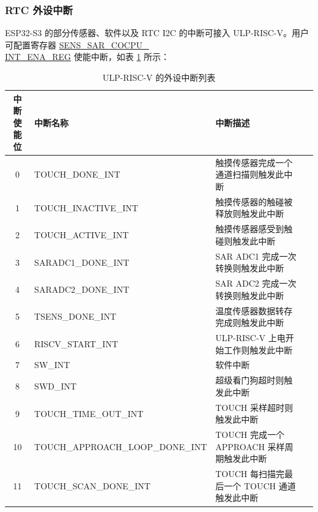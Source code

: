 \documentclass[main\_\_CN.tex]{subfiles}
\begin{document}
\subsubsection{RTC 外设中断}
ESP32-S3 的部分传感器、软件以及 RTC I2C 的中断可接入 ULP-RISC-V。用户可配置寄存器 \hyperref[regdesc:SENSSARCOCPUINTENAREG]{SENS\_SAR\_COCPU\_\\INT\_ENA\_REG} 使能中断，如表 \ref{tab:PicoRV32-interrupt-list} 所示：

\begin{table}[H]
    \centering
    \begin{tabular}{ c l l l }
    \textbf{中断使能位} & \textbf{中断名称} & \textbf{中断描述} \\ \hline
    0 & \label{interrupt:SENSCOCPUTOUCHDONEINT}TOUCH\_DONE\_INT & 触摸传感器完成一个通道扫描则触发此中断 \\
    1 & \label{interrupt:SENSCOCPUTOUCHINACTIVEINT}TOUCH\_INACTIVE\_INT & 触摸传感器的触碰被释放则触发此中断 \\
    2 & \label{interrupt:SENSCOCPUTOUCHACTIVEINT}TOUCH\_ACTIVE\_INT & 触摸传感器感受到触碰则触发此中断 \\
    3 & \label{interrupt:SENSCOCPUSARADC1DONEINT}SARADC1\_DONE\_INT & SAR ADC1 完成一次转换则触发此中断 \\
    4 & \label{interrupt:SENSCOCPUSARADC2DONEINT}SARADC2\_DONE\_INT & SAR ADC2 完成一次转换则触发此中断 \\
    5 & \label{interrupt:SENSCOCPUTSENSINT}TSENS\_DONE\_INT & 温度传感器数据转存完成则触发此中断 \\
    6 & \label{interrupt:SENSCOCPUSTARTINT}RISCV\_START\_INT & ULP-RISC-V 上电开始工作则触发此中断 \\
    7 & \label{interrupt:SENSCOCPUSWINT}SW\_INT & 软件中断 \\
    8 & \label{interrupt:SENSCOCPUSWDINT}SWD\_INT & 超级看门狗超时则触发此中断 \\
    9 & TOUCH\_TIME\_OUT\_INT \label{interrupt:TOUCHTIMEOUTINT}& TOUCH 采样超时则触发此中断 \\
    10& TOUCH\_APPROACH\_LOOP\_DONE\_INT & TOUCH 完成一个 APPROACH 采样周期触发此中断 \\
    11& TOUCH\_SCAN\_DONE\_INT & TOUCH 每扫描完最后一个 TOUCH 通道触发此中断 \\
    \end{tabular}
    \caption{ULP-RISC-V 的外设中断列表}
    \label{tab:PicoRV32-interrupt-list}
\end{table}
\end{document}
